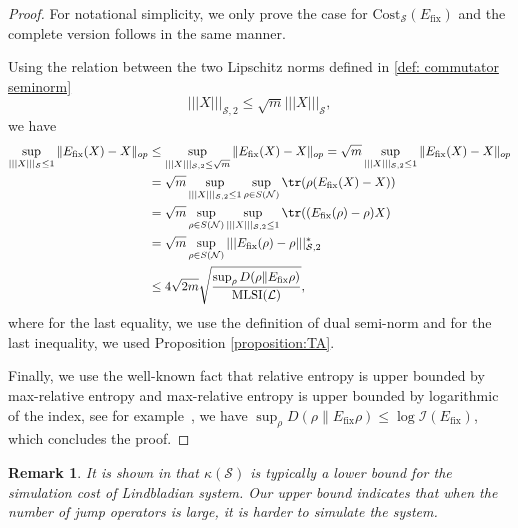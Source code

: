 \documentclass[11pt,reqno]{amsart}
\numberwithin{equation}{section}
\newtheorem{remark}[lemma]{Remark}
\newcommand{\mc}{\mathcal}
\newcommand{\Cost}{\mathrm{Cost}}
\newcommand{\fix}{\mathrm{fix}}
\begin{document}
\begin{proof}
For notational simplicity, we only prove the case for $\Cost_{\mc S}(E_\fix)$ and the complete version follows in the same manner.
		
Using the relation between the two Lipschitz norms defined in \eqref{def: commutator seminorm}
\begin{equation}
    |||X|||_{\mc S,2} \le \sqrt{m} |||X|||_{\mc S}, 
\end{equation}
we have 
\begin{align*}
    \sup_{|||X|||_{\mc S} \le 1} \|E_\fix(X) - X\|_{op} & \le \sup_{|||X|||_{\mc S,2} \le \sqrt{m}} \|E_\fix(X) - X\|_{op} = \sqrt{m} \sup_{|||X|||_{\mc S,2} \le 1} \|E_\fix(X) - X\|_{op} \\
    & = \sqrt{m} \sup_{|||X|||_{\mc S,2} \le 1} \sup_{\rho \in S(\mc N)}\tr(\rho(E_\fix(X) - X)) \\
    & = \sqrt{m} \sup_{\rho \in S(\mc N)}\sup_{|||X|||_{\mc S,2} \le 1} 
 \tr((E_\fix(\rho) - \rho ) X) \\
  & = \sqrt{m} \sup_{\rho \in S(\mc N)} |||E_\fix(\rho) - \rho|||_{\mc S,2}^* \\
  & \le 4\sqrt{2m}\sqrt{\frac{\sup_\rho D(\rho \| E_\fix \rho)}{\mathrm{MLSI}(\mc L)}},
\end{align*}
where for the last equality, we use the definition of dual semi-norm and for the last inequality, we used Proposition \ref{proposition:TA}. 

Finally, we use the well-known fact that relative entropy is upper bounded by max-relative entropy and max-relative entropy is upper bounded by logarithmic of the index, see for example~\cite{GJL20entropy}, we have $\sup_\rho D(\rho \| E_\fix \rho) \le \log \mc I(E_\fix)$, which concludes the proof. 
\end{proof}
\begin{remark}
    It is shown in \cite{ding2024lower} that $\kappa(\mc S)$ is typically a lower bound for the simulation cost of Lindbladian system. Our upper bound indicates that when the number of jump operators is large, it is harder to simulate the system.
\end{remark}
\iffalse
\end{document}
